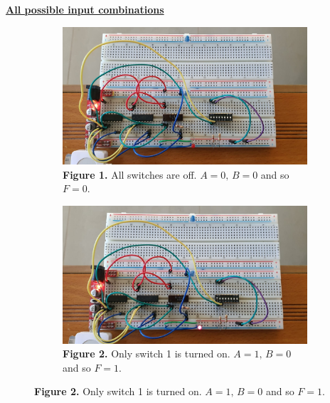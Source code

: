 \documentclass[a4paper]{article}
\begin{document}
\vspace*{\fill}
\newpage
{}
\vspace*{\fill}
\begin{center}
  {\Huge\textbf{\underline{All possible input combinations}}}
\end{center}
\vspace*{\fill}
\newpage
\begin{figure}
     \centering
     \begin{subfigure}[b]{0.9\textwidth}
         \centering
         \includegraphics[angle=90, width=\textwidth]{alloff.jpeg}
         \caption*{\textbf{Figure 1.} All switches are off. $A=0,\,B=0$ and so $F=0$.\vspace{2em}}
         \label{fig:alloff}
     \end{subfigure}
     \hfill
     \begin{subfigure}[b]{0.9\textwidth}
         \centering
         \includegraphics[angle=90, width=\textwidth]{1on.jpeg}
         \caption*{\textbf{Figure 2. }Only switch 1 is turned on. $A=1,\,B=0$ and so $F=1$.}
         \label{fig:1on}
     \end{subfigure}
 \end{figure}
\end{document}
